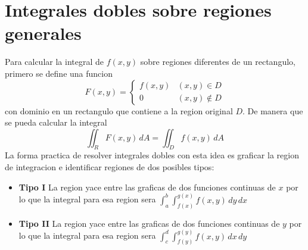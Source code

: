 \documentclass[12pt]{article}
\begin{document}
\section{Integrales dobles sobre regiones generales}
Para calcular la integral de $f(x,y)$ sobre regiones diferentes de un rectangulo, primero se
define una funcion $$F(x,y) = \begin{cases} f(x,y) & (x,y) \in D\\0 & (x,y) \not \in D\end{cases}$$
con dominio en un rectangulo que contiene a la region original $D$. De manera que se pueda calcular
la integral $$\iint_R F(x,y)\,dA = \iint_D f(x,y)\,dA$$
La forma practica de resolver integrales dobles con esta idea es graficar la region de integracion
e identificar regiones de dos posibles tipos:\\
\begin{itemize}
\item \textbf{Tipo I} La region yace entre las graficas de dos funciones continuas de $x$
por lo que la integral para esa region sera $\int_a^b\int_{f(x)}^{g(x)} f(x,y) \,dy\,dx$
\item \textbf{Tipo II} La region yace entre las graficas de dos funciones continuas de $y$
por lo que la integral para esa region sera $\int_c^d\int_{f(y)}^{g(y)} f(x,y) \,dx\,dy$
\end{itemize}
\end{document}
